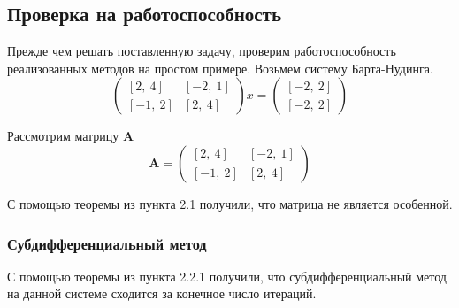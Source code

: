 \documentclass{article}
\begin{document}
    \subsection{Проверка на работоспособность}
    
    Прежде чем решать поставленную задачу, проверим работоспособность реализованных методов на простом примере. Возьмем систему Барта-Нудинга.
    \begin{equation*}
        \begin{pmatrix}
             [2, \ 4] & [-2, \ 1] \\
             [-1, \ 2]  & [2, \ 4] 
        \end{pmatrix}
        x
        =
        \begin{pmatrix}
             [-2, \ 2] \\
             [-2, \ 2] 
        \end{pmatrix}
        
    \end{equation*}
    
    Рассмотрим матрицу \textbf{A}
    \begin{equation*}
        \textbf{A} = \begin{pmatrix}
             [2, \ 4] & [-2, \ 1] \\
             [-1, \ 2]  & [2, \ 4] 
        \end{pmatrix}
    \end{equation*}
    
    С помощью теоремы из пункта 2.1 получили, что матрица не является особенной.
    
    
    \subsubsection{Субдифференциальный метод}
    С помощью теоремы из пункта 2.2.1 получили, что субдифференциальный метод на данной системе сходится за конечное число итераций.
    
\end{document}
